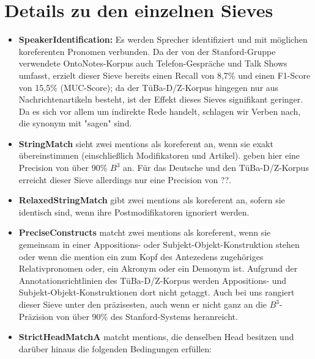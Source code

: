 \documentclass{scrartcl}
\begin{document}
\section{Details zu den einzelnen Sieves}

\begin{itemize}

\item \textbf{SpeakerIdentification:} Es werden Sprecher identifiziert und mit möglichen koreferenten Pronomen verbunden. Da der von der Stanford-Gruppe verwendete OntoNotes-Korpus auch Telefon-Gespräche und Talk Shows umfasst, erzielt dieser Sieve bereits einen Recall von 8,7\% und einen F1-Score von 15,5\% (MUC-Score); da der TüBa-D/Z-Korpus hingegen nur aus Nachrichtenartikeln besteht, ist der Effekt dieses Sieves signifikant geringer. Da es sich vor allem um indirekte Rede handelt, schlagen wir Verben nach, die synonym mit "sagen" sind.  \cite{broscheit2010}

\item \textbf{StringMatch} sieht zwei mentions als koreferent an, wenn sie exakt übereinstimmen (einschließlich Modifikatoren und Artikel). geben hier eine Precision von über 90\% $B^3$ an. Für das Deutsche und den TüBa-D/Z-Korpus erreicht dieser Sieve allerdings nur eine Precision von ??.

\item \textbf{RelaxedStringMatch} gibt zwei mentions als koreferent an, sofern sie identisch sind, wenn ihre Postmodifikatoren ignoriert werden.

\item \textbf{PreciseConstructs} matcht zwei mentions als koreferent, wenn sie gemeinsam in einer Appositions- oder Subjekt-Objekt-Konstruktion stehen oder wenn die mention ein zum Kopf des Antezedens zugehöriges Relativpronomen oder, ein Akronym oder ein Demonym ist. Aufgrund der Annotationsrichtlinien des TüBa-D/Z-Korpus werden Appositions- und Subjekt-Objekt-Konstruktionen dort nicht getaggt. Auch bei uns rangiert dieser Sieve unter den präzisesten, auch wenn er nicht ganz an die $B^3$-Präzision von über 90\% des Stanford-Systems heranreicht.

\item \textbf{StrictHeadMatchA} matcht mentions, die denselben Head besitzen und darüber hinaus die folgenden Bedingungen erfüllen:



\end{itemize}
\end{document}
